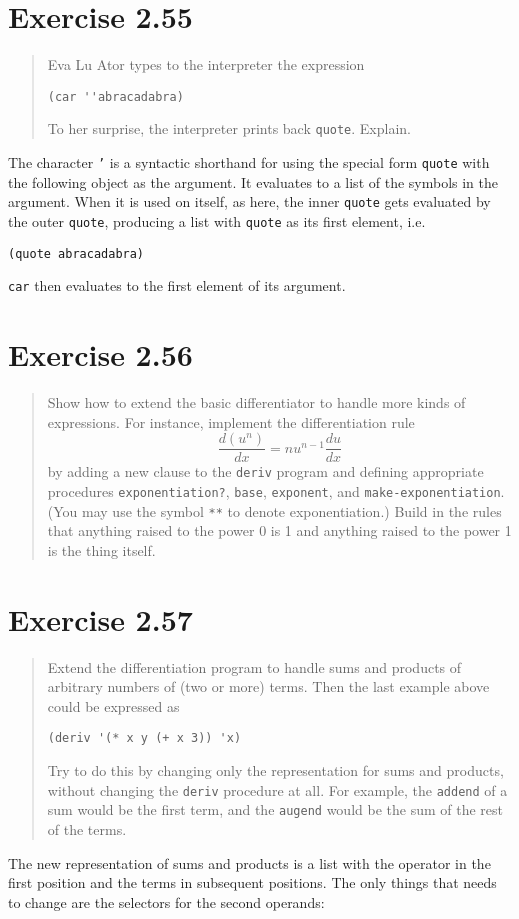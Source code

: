 \documentclass{article}
\begin{document}
\section{Exercise 2.55}
\begin{quote}
    Eva Lu Ator types to the interpreter the expression

    \begin{lstlisting}
(car ''abracadabra)
    \end{lstlisting}

    To her surprise, the interpreter prints back \texttt{quote}. Explain.
\end{quote}

The character \texttt{'} is a syntactic shorthand for using the special form
\texttt{quote} with the following object as the argument. It evaluates to a
list of the symbols in the argument. When it is used on itself, as here, the
inner \texttt{quote} gets evaluated by the outer \texttt{quote}, producing a
list with \texttt{quote} as its first element, i.e.
\begin{lstlisting}
(quote abracadabra)
\end{lstlisting}
\texttt{car} then evaluates to the first element of its argument.

\section{Exercise 2.56}
\begin{quote}
    Show how to extend the basic differentiator to handle more kinds of
    expressions. For instance, implement the differentiation rule
    $$\frac{d(u^n)}{dx} = nu^{n-1}\frac{du}{dx}$$
    by adding a new clause to the \texttt{deriv} program and defining
    appropriate procedures \texttt{exponentiation?}, \texttt{base},
    \texttt{exponent}, and \texttt{make-exponentiation}. (You may use the
    symbol \texttt{**} to denote exponentiation.) Build in the rules that
    anything raised to the power 0 is 1 and anything raised to the power 1 is
    the thing itself.
\end{quote}




\section{Exercise 2.57}
\begin{quote}
    Extend the differentiation program to handle sums and products of arbitrary
    numbers of (two or more) terms. Then the last example above could be
    expressed as
    \begin{lstlisting}
(deriv '(* x y (+ x 3)) 'x)
    \end{lstlisting}
    Try to do this by changing only the representation for sums and products,
    without changing the \texttt{deriv} procedure at all. For example, the
    \texttt{addend} of a sum would be the first term, and the \texttt{augend}
    would be the sum of the rest of the terms.
\end{quote}

The new representation of sums and products is a list with the operator in the
first position and the terms in subsequent positions. The only things that needs
to change are the selectors for the second operands:

\end{document}
